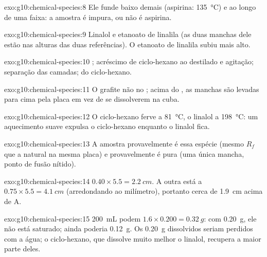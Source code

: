 \begin{solution}{exo:g10:chemical-species:8}
Ele funde baixo demais (aspirina: \qty{135}{\celsius}) e ao longo de uma
faixa: a amostra é impura, ou não é aspirina.
\end{solution}

\begin{solution}{exo:g10:chemical-species:9}
Linalol e etanoato de linalila (as duas manchas dele estão nas alturas
das duas referências). O etanoato de linalila subiu mais alto.
\end{solution}

\begin{solution}{exo:g10:chemical-species:10}
; acréscimo de ciclo-hexano ao destilado e agitação;
separação das camadas;  do ciclo-hexano.
\end{solution}

\begin{solution}{exo:g10:chemical-species:11}
O grafite não  no ; acima do , as manchas são
levadas para cima pela placa em vez de se dissolverem na cuba.
\end{solution}

\begin{solution}{exo:g10:chemical-species:12}
O ciclo-hexano ferve a \qty{81}{\celsius}, o linalol a
\qty{198}{\celsius}: um aquecimento suave expulsa o ciclo-hexano
enquanto o linalol fica.
\end{solution}

\begin{solution}{exo:g10:chemical-species:13}
A amostra provavelmente é essa espécie (mesmo $R_f$ que a natural na
mesma placa) e provavelmente é pura (uma única mancha, ponto de fusão
nítido).
\end{solution}

\begin{solution}{exo:g10:chemical-species:14}
$0.40 \times 5.5 = \qty{2.2}{cm}$. A outra está a $0.75 \times 5.5 =
\qty{4.1}{cm}$ (arredondando ao milímetro), portanto cerca de
\qty{1.9}{cm} acima de A.
\end{solution}

\begin{solution}{exo:g10:chemical-species:15}
\qty{200}{mL} podem  $1.6 \times 0.200 = \qty{0.32}{g}$: com
\qty{0.20}{g}, ele não está saturado; ainda poderia 
\qty{0.12}{g}. Os \qty{0.20}{g} dissolvidos seriam perdidos com a água;
o ciclo-hexano, que dissolve muito melhor o linalol, recupera a maior
parte deles.
\end{solution}

